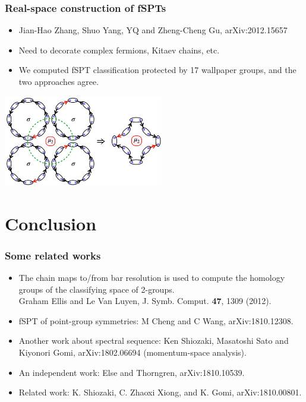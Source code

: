 \documentclass[xcolor=table, 11pt, aspectratio=1610]{beamer}
\begin{document}
\begin{frame}
  \frametitle{Real-space construction of fSPTs}

  \begin{itemize}
  \item Jian-Hao Zhang, Shuo Yang, YQ and Zheng-Cheng Gu, arXiv:2012.15657
  \item Need to decorate complex fermions, Kitaev chains, etc.
  \item We computed fSPT classification protected by 17 wallpaper groups, and the two approaches agree.
  \end{itemize}
  \begin{center}
    \includegraphics[height=4cm]{majorana_bubble}    
  \end{center}
\end{frame}

\section{Conclusion}

\begin{frame}
  \frametitle{Some related works}
  \begin{itemize}
  \item The chain maps to/from bar resolution is used to compute the homology groups of the classifying space of 2-groups.\\
    Graham Ellis and Le Van Luyen, J. Symb. Comput. \textbf{47}, 1309 (2012).
  \item fSPT of point-group symmetries:
    M Cheng and C Wang, arXiv:1810.12308.
  \item Another work about spectral sequence: Ken Shiozaki, Masatoshi Sato and Kiyonori Gomi, arXiv:1802.06694 (momentum-space analysis).
  \item An independent work: Else and Thorngren, arXiv:1810.10539.
  \item Related work: K. Shiozaki, C. Zhaoxi Xiong, and K. Gomi,
    arXiv:1810.00801.
  \end{itemize}
\end{frame}
\end{document}

